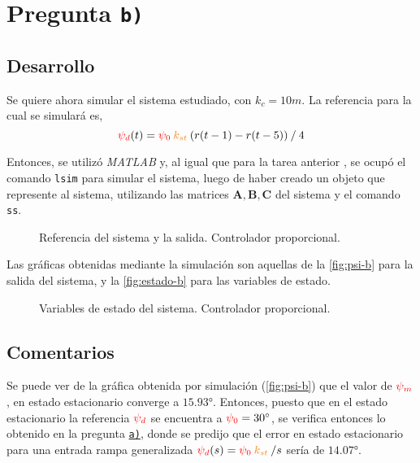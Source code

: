 \section{Pregunta \texttt{b)}}\label{pregunta-b}

\subsection{Desarrollo}

Se quiere ahora simular el sistema estudiado, con $k_{c} = 10\unit{m}$.
La referencia para la cual se simulará es,
\begin{equation}
  \rojo{\psi_{d}}(t) = \rojo{\psi_{0}}\nara{k_{st}}\left(r(t-1) - r(t-5)\right) \mathbin{/} 4
  \label{eq:referencia}
\end{equation}

Entonces, se utilizó \textit{MATLAB} y, al igual que para la tarea anterior \cite{tarea-1-sdc},
se ocupó el comando \verb|lsim| para simular el sistema, luego de haber
creado un objeto que represente al sistema, utilizando las matrices
$\mathbf{A}, \mathbf{B}, \mathbf{C}$ del sistema y el comando \verb|ss|.

\begin{figure}[ht]
  \centering
  
  \caption{Referencia del sistema y la salida. Controlador proporcional.}
  \label{fig:psi-b}
\end{figure}

Las gráficas obtenidas mediante la simulación son aquellas de la \autoref{fig:psi-b} para
la salida del sistema, y la \autoref{fig:estado-b} para las variables de estado.

\begin{figure}[ht]
  \centering
  
  \caption{Variables de estado del sistema. Controlador proporcional.}
  \label{fig:estado-b}
\end{figure}

\subsection{Comentarios}

Se puede ver de la gráfica obtenida por simulación (\autoref{fig:psi-b}) que el
valor de $\mathbin{\color{red}\psi_{m}}$, en estado estacionario converge a $\ang{15.93}$.
Entonces, puesto que en el estado estacionario la referencia $\mathbin{\color{red}\psi_{d}}$
se encuentra a $\mathbin{\color{red}\psi_{0}} = \ang{30}$, se verifica entonces lo obtenido en
la pregunta \hyperref[pregunta-a]{\texttt{a)}}, donde se predijo que el error en
estado estacionario para una entrada rampa generalizada
$\rojo{\psi_{d}}(s) = \rojo{\psi_{0}}\nara{k_{st}}\mathbin{/}s$ sería de $\ang{14.07}$.

